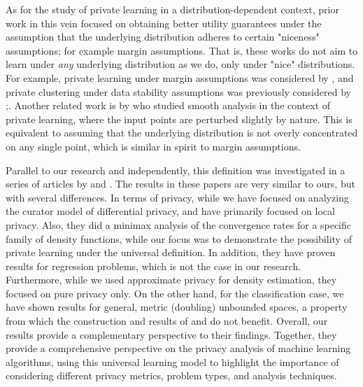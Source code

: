 \documentclass[12pt,a4paper,oneside,onecolumn]{book}
\begin{document}
As for the study of private learning in a distribution-dependent context, prior work in this vein focused on obtaining better utility guarantees under the assumption that the underlying distribution adheres to certain "niceness" assumptions; for example margin assumptions. That is, these works do not aim to learn under {\em any} underlying distribution as we do, only under "nice" distributions. For example, private learning under margin assumptions was considered by \cite{BlumDMN05,ChaudhuriHS14,BunCS20,NguyenUZ20}, and private clustering under data stability assumptions was previously considered by \citet{NissimRS07,NIPS2015_051e4e12,HuangL18};\citet{ShechnerSS20,CohenKMST21,FriendlyCore}. Another related work is by \cite{HaghtalabRS20} who studied smooth analysis in the context of private learning, where the input points are perturbed slightly by nature. This is equivalent to assuming that the underlying distribution is not overly concentrated on any single point, which is similar in spirit to margin assumptions.

Parallel to our research and independently, this definition was investigated in a series of articles by \citet{gyorfi2023multivariate, gyorfi2022rate} and \citet{berrett2019classification}. The results in these papers are very similar to ours, but with several differences. In terms of privacy, while we have focused on analyzing the curator model of differential privacy, \citet{gyorfi2023multivariate, gyorfi2022rate} and \citet{berrett2019classification} have primarily focused on local privacy. Also, they did a minimax analysis of the convergence rates for a specific family of density functions, while our focus was to demonstrate the possibility of private learning under the universal definition.
In addition, they have proven results for regression problems, which is not the case in our research. Furthermore, while we used approximate privacy for density estimation, they focused on pure privacy only.
On the other hand, for the classification case, we have shown results for general, metric (doubling) unbounded spaces, a property from which the construction and results of \citet{gyorfi2023multivariate, gyorfi2022rate} and \citet{berrett2019classification} do not benefit. 
Overall, our results provide a complementary perspective to their findings. Together, they provide a comprehensive perspective on the privacy analysis of machine learning algorithms, using this universal learning model to highlight the importance of considering different privacy metrics, problem types, and analysis techniques.
\end{document}
